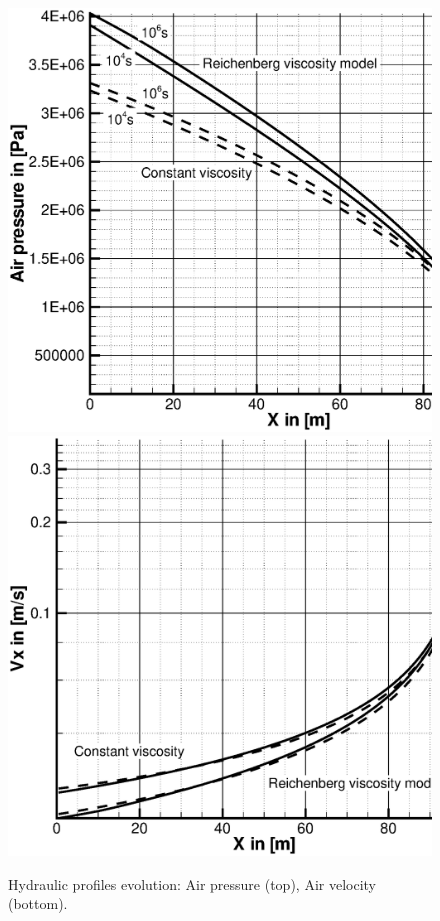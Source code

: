 \begin{figure}[htb!]
\includegraphics[scale=0.3]{PART_II/G/press_ply.eps}
\includegraphics[scale=0.3]{PART_II/G/velo_ply.eps}
\caption{Hydraulic profiles evolution: Air pressure (top), Air velocity (bottom).}
\label{fig:air_flow}
\end{figure}

